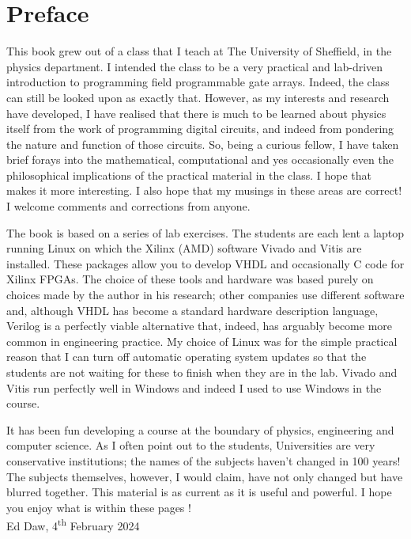 \documentclass[../physical_computing.tex]{subfiles}
\begin{document}
\chapter*{Preface}

This book grew out of a class that I teach at The University of Sheffield, in the physics department. I intended the class to be a very practical and lab-driven introduction to programming field programmable gate arrays. Indeed, the class can still be looked upon as exactly that. However, as my interests and research have developed, I have realised that there is much to be learned about physics itself from the work of programming digital circuits, and indeed from pondering the nature and function of those circuits. So, being a curious fellow, I have taken brief forays into the mathematical, computational and yes occasionally even the philosophical implications of the practical material in the class. I hope that makes it more interesting. I also hope that my musings in these areas are correct! I welcome comments and corrections from anyone.

The book is based on a series of lab exercises. The students are each lent a laptop running Linux on which the Xilinx (AMD) software Vivado and Vitis are installed. These packages allow you to develop VHDL and occasionally C code for Xilinx FPGAs. The choice of these tools and hardware was based purely on choices made by the author in his research; other companies use different software and, although VHDL has become a standard hardware description language, Verilog is a perfectly viable alternative that, indeed, has arguably become more common in engineering practice. My choice of Linux was for the simple practical reason that I can turn off automatic operating system updates so that the students are not waiting for these to finish when they are in the lab. Vivado and Vitis run perfectly well in Windows and indeed I used to use Windows in the course.

It has been fun developing a course at the boundary of physics, engineering and computer science. As I often point out to the students, Universities are very conservative institutions; the names of the subjects haven't changed in 100 years! The subjects themselves, however, I would claim, have not only changed but have blurred together. This material is as current as it is useful and powerful. I hope you enjoy what is within these pages !\\

\noindent
Ed Daw, 4\textsuperscript{th} February 2024
\end{document}
